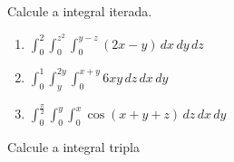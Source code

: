 




	
	\vspace{5mm}
	
	Calcule a integral iterada.
	
	\begin{enumerate}
		
		\item $\displaystyle \int_{0}^{2} \int_{0}^{z^2} \int_{0}^{y-z} (2x - y) \, dx \, dy \, dz$
		
		\item $\displaystyle \int_{0}^{1} \int_{y}^{2y} \int_{0}^{x+y} 6xy \, dz \, dx \, dy$
		
		\item $\displaystyle \int_{0}^{\frac{\pi}{2}} \int_{0}^{y} \int_{0}^{x} \cos(x+y+z) \, dz \, dx \, dy$
	
	\end{enumerate}
	
	\vspace{5mm}
	
	Calcule a integral tripla
	
